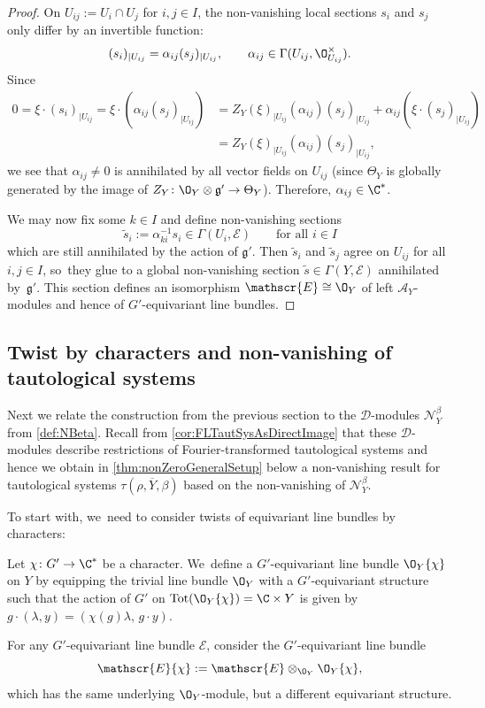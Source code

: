 \documentclass[JEP,XML,SOM,Unicode,published]{cedram}
\newcommand{\cA}{\mathscr{A}}
\newcommand{\frg}{\mathfrak{g}}
\DeclareMathOperator{\Tot}{Tot}
\newcommand\restr[2]{{#1_{| {#2}}}}
\newcommand\restrK[2]{{(#1)_{| {#2}}}}
\begin{document}
\begin{proof}
On $U_{ij} := U_i \cap U_j$ for $i,j \in I$, the non-vanishing local sections $s_i$ and $s_j$ only differ by an invertible function:
\[
\restrK{s_i}{U_{ij}} = \alpha_{ij} \restrK{s_j}{U_{ij}}, \qquad \alpha_{ij} \in \Gamma(U_{ij},\O_{U_{ij}}^\times).
\]
Since
\begin{align*}
0 = \xi \cdot \restrK{s_i}{U_{ij}} = \xi \cdot (\alpha_{ij} \restrK{s_j}{U_{ij}}) &= \restr{Z_Y(\xi)}{U_{ij}}(\alpha_{ij}) \restrK{s_j}{U_{ij}} + \alpha_{ij} (\xi \cdot \restrK{s_j}{U_{ij}}) \\
&= \restr{Z_Y(\xi)}{U_{ij}}(\alpha_{ij}) \restrK{s_j}{U_{ij}},
\end{align*}
we see that $\alpha_{ij} \neq 0$ is annihilated by all vector fields on $U_{ij}$ (since $\Theta_Y$ is globally generated by the image of $Z_Y \colon \O_Y \otimes \frg' \to \Theta_Y$). Therefore, $\alpha_{ij} \in \C^*$.

We may now fix some $k \in I$ and define non-vanishing sections
\[
\tilde s_i := \alpha_{ki}^{-1} s_i \in \Gamma(U_i,\mathscr{E}) \qquad \text{for all } i \in I
\]
which are still annihilated by the action of $\frg'$.
Then $\tilde s_i$ and $\tilde s_j$ agree on $U_{ij}$ for all $i,j \in I$, so~they glue to a global non-vanishing section $\tilde s \in \Gamma(Y,\mathscr{E})$ annihilated by~$\frg'$. This section defines an isomorphism $\mathscr{E} \cong \O_Y$ of left $\cA_Y$\nobreakdash-mod\-ules and hence of $G'$\nobreakdash-equi\-variant line bundles.
\end{proof}

\subsection{Twist by characters and non-vanishing of tautological systems} \label{sec:Twists}

Next we relate the construction from the previous section to the $\mathscr D$\nobreakdash-mod\-ules $\mathscr N_Y^\beta$ from \cref{def:NBeta}. Recall from \cref{cor:FLTautSysAsDirectImage} that these $\mathscr D$\nobreakdash-mod\-ules describe restrictions of Fourier-transformed tautological systems and hence we obtain in \cref{thm:nonZeroGeneralSetup} below a non-vanishing result for tautological systems $\tau(\rho, \overline Y, \beta)$ based on the non-vanishing of $\mathscr N_Y^\beta$.

To start with, we~need to consider twists of equivariant line bundles by characters:

\begin{dfn}\label{def:EquLineChar}
Let $\chi \colon G' \to \C^*$ be a character. We~define a $G'$-equivariant line bundle $\O_Y\{\chi\}$ on $Y$ by equipping the trivial line bundle $\O_Y$ with a $G'$-equivariant structure such that the action of $G'$ on $\Tot(\O_Y\{\chi\}) = \C \times Y$ is given by $g \cdot (\lambda,y) = (\chi(g)\lambda, \, g \cdot y)$.

For any $G'$-equivariant line bundle $\mathscr{E}$, consider the $G'$-equivariant line bundle
\[
\mathscr{E}\{\chi\} := \mathscr{E} \otimes_{\O_Y} \O_Y\{\chi\},
\]
which has the same underlying $\O_Y$\nobreakdash-mod\-ule, but a different equivariant structure.
\end{dfn}
\end{document}
